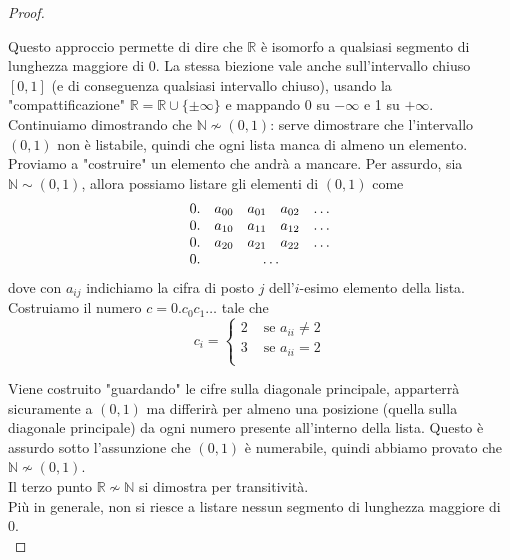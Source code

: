 \begin{proof}
\begin{center}
	\end{center}
	
	Questo approccio permette di dire che $\mathbb{R}$ è isomorfo a qualsiasi segmento di lunghezza maggiore di $0$. La stessa biezione vale anche sull'intervallo chiuso $[0,1]$ (e di conseguenza qualsiasi intervallo chiuso), usando la "compattificazione" $\mathbb{R} = \mathbb{R} \cup \{\pm \infty\}$ e mappando $0$ su $-\infty$ e 1 su $+ \infty$.\\
	
	Continuiamo dimostrando che $\mathbb{N} \not \sim (0,1)$: serve dimostrare che l'intervallo $(0,1)$ non è listabile, quindi che ogni lista manca di almeno un elemento. Proviamo a "costruire" un elemento che andrà a mancare. Per assurdo, sia $\mathbb{N} \sim (0,1)$, allora possiamo listare gli elementi di $(0,1)$ come 
	$$ 
	\begin{array}{c c c c c}
		0. & a_{00} & a_{01} & a_{02} & \dots \\
		0. & a_{10} & a_{11} & a_{12} & \dots \\
		0. & a_{20} & a_{21} & a_{22} & \dots \\
		0. & \multicolumn{4}{c}{\dots}
	\end{array}
	$$
	dove con $a_{ij}$ indichiamo la cifra di posto $j$ dell'$i$-esimo elemento della lista.\\
	
	Costruiamo il numero $c = 0.c_0 c_1 \dots$ tale che
	$$ c_{i} = \begin{cases}
		2 & \text{ se } a_{ii} \neq 2 \\
		3 & \text{ se } a_{ii} = 2 \\
	\end{cases}$$
	
	Viene costruito "guardando" le cifre sulla diagonale principale, apparterrà sicuramente a $(0,1)$ ma differirà per almeno una posizione (quella sulla diagonale principale) da ogni numero presente all'interno della lista. Questo è assurdo sotto l'assunzione che $(0,1)$ è numerabile, quindi abbiamo provato che $\mathbb{N} \not \sim (0,1)$.\\
	
	Il terzo punto $\mathbb{R} \not \sim \mathbb{N}$ si dimostra per transitività.\\
	
	Più in generale, non si riesce a listare nessun segmento di lunghezza maggiore di 0.\\
\end{proof}

